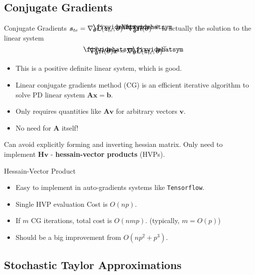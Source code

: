 \documentclass[blue]{beamer}
\newcommand\lowerwidehatsym{%
  \text{\smash{\raisebox{-1.3ex}{%
    $\fixwidehatsym$}}}}
\newcommand\fixwidehat[1]{%
  \mathchoice
    {\accentset{\displaystyle\lowerwidehatsym}{#1}}
    {\accentset{\textstyle\lowerwidehatsym}{#1}}
    {\accentset{\scriptstyle\lowerwidehatsym}{#1}}
    {\accentset{\scriptscriptstyle\lowerwidehatsym}{#1}}
}
\begin{document}
\subsection{Conjugate Gradients}

\begin{frame}{Conjugate Gradients}{}
$\bm{s}_{te} = \nabla_{\bm{\theta}}\mathcal{L}(\bm{z}_{te}, \fixwidehat{\bm{\theta}})^{\top}\nabla^2_{\bm{\theta}}R(\fixwidehat{\bm{\theta}})^{-1}$
is actually the solution to the linear system
$$
\nabla^2_{\bm{\theta}}R(\fixwidehat{\bm{\theta}}) \bm{x} = \nabla_{\bm{\theta}}\mathcal{L}(\bm{z}_{te}, \fixwidehat{\bm{\theta}})^{\top}
$$
\begin{itemize}
  \item This is a positive definite linear system, which is good.
  \item Linear conjugate gradients method (CG) is an efficient iterative algorithm to solve PD linear system $\bm{Ax} = \bm{b}$.
  \item Only requires quantities like $\bm{Av}$ for arbitrary vectors $\bm{v}$.
  \item No need for $\bm{A}$ itself!
\end{itemize}
Can avoid explicitly forming and inverting hessian matrix. Only need to implement $\bm{Hv}$ - \textbf{hessain-vector products} (HVPs).
\end{frame}

\begin{frame}{Hessain-Vector Product}{}
\begin{itemize}
  \item Easy to implement in auto-gradients systems like \texttt{Tensorflow}.
  \item Single HVP evaluation Cost is $O(np)$.
  \item If $m$ CG iterations, total cost is $O(nmp)$. (typically, $m=O(p)$)
  \item Should be a big improvement from $O(np^2 + p^3)$.
\end{itemize}
\end{frame}

\subsection{Stochastic Taylor Approximations}
\end{document}
